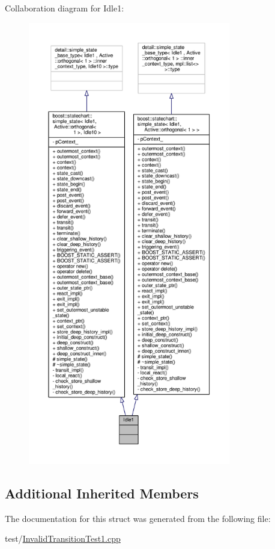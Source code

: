 Collaboration diagram for Idle1\+:
\nopagebreak
\begin{figure}[H]
\begin{center}
\leavevmode
\includegraphics[height=550pt]{struct_idle1__coll__graph}
\end{center}
\end{figure}
\subsection*{Additional Inherited Members}


The documentation for this struct was generated from the following file\+:\begin{DoxyCompactItemize}
\item 
test/\mbox{\hyperlink{_invalid_transition_test1_8cpp}{Invalid\+Transition\+Test1.\+cpp}}\end{DoxyCompactItemize}
